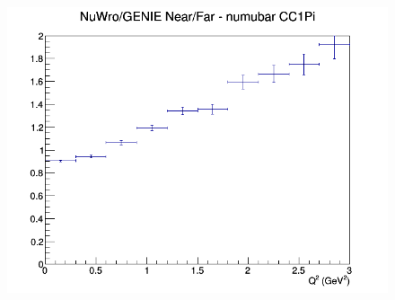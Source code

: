 \documentclass[12pt]{article}
\begin{document}
\begin{figure}[h]
\endminipage
{}
\includegraphics[width=\linewidth]{eff_Q2/LAr/ratios/CC1Pi_NuWro_GENIE_numubar_NF_Q2.png}
\endminipage
\newline
\end{figure}
\clearpage
\end{document}
